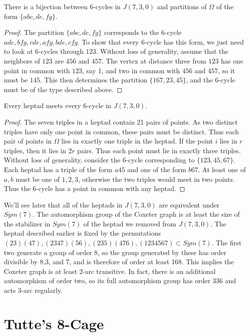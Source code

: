\begin{lemma}
	There is a bijection between 6-cycles in $J(7,3,0)$ and partitions of $\Omega$ of the form $\{abc,de,fg\}$.
\end{lemma}
\begin{proof}

The partition $\{abc,de,fg\}$ corresponds to the 6-cycle $ade,bfg,cde,afg,bde,cfg$.  To show that every 6-cycle has this form, we just need to look at 6-cycles through $123$.  Without loss of generality, assume that the neighbors of $123$ are $456$ and $457$.  The vertex at distance three from $123$ has one point in common with $123$, say 1, and two in common with $456$ and $457$, so it must be $145$.  This then determines the partition $\{167,23,45\}$, and the 6-cycle must be of the type described above.
\end{proof}

\begin{lemma}
	Every heptad meets every 6-cycle in $J(7,3,0)$.
\end{lemma}
\begin{proof}
	The seven triples in a heptad contain 21 pairs of points. As two distinct triples have only one point in common, these pairs must be distinct.  Thus each pair of points in $\Omega$ lies in exactly one triple in the heptad.  If the point $i$ lies in $r$ triples, then it lies in $2r$ pairs.  Thus each point must lie in exactly three triples.  Without loss of generality, consider the 6-cycle corresponding to $\{123,45,67\}$.  Each heptad has a triple of the form $a45$ and one of the form $b67$.  At least one of $a,b$ must be one of $1,2,3$, otherwise the two triples would meet in two points.  Thus the 6-cycle has a point in common with any heptad.
\end{proof}

We'll see later that all of the heptads in $J(7,3,0)$ are equivalent under $Sym(7)$.  The automorphism group of the Coxeter graph is at least the size of the stabilizer in $Sym(7)$ of the heptad we removed from $J(7,3,0)$.  The heptad described earlier is fixed by the permutations $(23)(47),(2347)(56),(235)(476),(1234567)\subset Sym(7)$.  The first two generate a group of order $8$, so the group generated by these has order divisible by 8,3, and 7, and is therefore of order at least 168.  This implies the Coxeter graph is at least 2-arc transitive.  In fact, there is an additional automorphism of order two, so its full automorphism group has order 336 and acts 3-arc regularly.


\section*{Tutte's 8-Cage}

